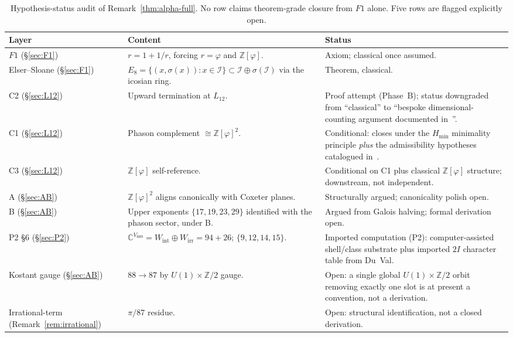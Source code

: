 \documentclass[12pt]{article}
\theoremstyle{definition}
\theoremstyle{remark}
\newcommand{\C}{\mathbb{C}}
\newcommand{\Z}{\mathbb{Z}}
\newcommand{\Zphi}{\mathbb{Z}[\varphi]}
\begin{document}
\begin{table}[h]
\centering
\small
\begin{tabular}{p{3.3cm}p{6.5cm}p{5cm}}
\toprule
Layer & Content & Status \\
\midrule
$F1$ (\S\ref{sec:F1}) & $r = 1 + 1/r$, forcing $r = \varphi$ and $\Zphi$. & Axiom; classical once assumed. \\
Elser--Sloane (\S\ref{sec:F1}) & $E_8 = \{(x,\sigma(x)) : x \in \mathcal{I}\} \subset \mathcal{I} \oplus \sigma(\mathcal{I})$ via the icosian ring. & Theorem, classical. \\
C2 (\S\ref{sec:L12}) & Upward termination at $L_{12}$. & Proof attempt (Phase~B); status downgraded from ``classical'' to ``bespoke dimensional-counting argument documented in~\citep{CascadePhaseB}''. \\
C1 (\S\ref{sec:L12}) & Phason complement $\cong \Zphi^2$. & Conditional: closes under the $H_{\min}$ minimality principle \emph{plus} the admissibility hypotheses catalogued in~\citep{Cascade12D}. \\
C3 (\S\ref{sec:L12}) & $\Zphi$ self-reference. & Conditional on C1 plus classical $\Zphi$ structure; downstream, not independent. \\
A (\S\ref{sec:AB}) & $\Zphi^2$ aligns canonically with Coxeter planes. & Structurally argued; canonicality polish open. \\
B (\S\ref{sec:AB}) & Upper exponents $\{17,19,23,29\}$ identified with the phason sector, under B. & Argued from Galois halving; formal derivation open. \\
P2 \S 6 (\S\ref{sec:P2}) & $\C^{V_{600}} = W_{\mathrm{int}} \oplus W_{\mathrm{irr}} = 94 + 26$; $\{9,12,14,15\}$. & Imported computation (P2): computer-assisted shell/class substrate plus imported $2I$ character table from Du~Val. \\
Kostant gauge (\S\ref{sec:AB}) & $88 \to 87$ by $U(1) \times \Z/2$ gauge. & Open: a single global $U(1) \times \Z/2$ orbit removing exactly one slot is at present a convention, not a derivation. \\
Irrational-term (Remark~\ref{rem:irrational}) & $\pi / 87$ residue. & Open: structural identification, not a closed derivation. \\
\bottomrule
\end{tabular}
\caption{Hypothesis-status audit of Remark~\ref{thm:alpha-full}. No row claims theorem-grade closure from $F1$ alone. Five rows are flagged explicitly open.}
\label{tab:status}
\end{table}
\end{document}
